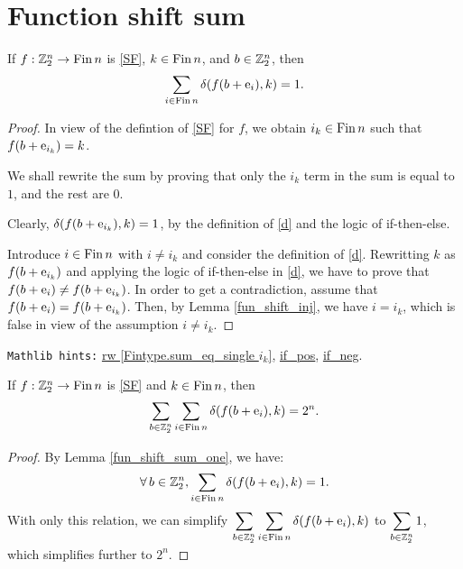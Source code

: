 
\section{Function shift sum}

\bigskip

\begin{lemma}
\label{fun_shift_sum_one}
\leanok
If $f:\mathbb{Z}_2^n \to \mathrm{Fin}\, n$ is \eqref{SF}, $k\in\mathrm{Fin}\, n$, and $b\in\mathbb{Z}_2^n$, then
$$\sum_{i\in\mathrm{Fin}\, n} \delta(f(b+{\rm e}_i),k) = 1.$$
\end{lemma}

\begin{proof}
\leanok
In view of the defintion of \eqref{SF} for $f$, we {\B obtain} $i_k\in\mathrm{Fin}\, n$ such that $f(b+{\rm e}_{i_k}) = k$.

We shall {\B rewrite} the sum by proving that {\B only the $i_k$ term in the sum is equal to $1$, and the rest are $0$}.

Clearly, $\delta(f(b+{\rm e}_{i_k}),k) = 1$, by the definition of \eqref{d} and the logic of {\B if-then-else}.

{\B Introduce} $i\in\mathrm{Fin}\, n$ with $i\neq i_k$ and consider the definition of \eqref{d}. {\B Rewritting} $k$ as  $f(b+{\rm e}_{i_k})$ and {\B applying} the logic of {\B if-then-else} in \eqref{d}, we have to prove that $f(b+{\rm e}_i) \neq f(b+{\rm e}_{i_k})$. In order to get a {\B contradiction}, assume that $f(b+{\rm e}_i) = f(b+{\rm e}_{i_k})$. Then, by {\B Lemma} \ref{fun_shift_inj}, we {\B have} $i=i_k$, which is {\B false} in view of the assumption $i\neq i_k$.
\end{proof}

\verb|Mathlib hints:| \href{https://leanprover-community.github.io/mathlib4_docs/Mathlib/Data/Fintype/BigOperators.html#Fintype.sum_eq_single}{rw [Fintype.sum\_eq\_single $i_k$]}, \href{https://leanprover-community.github.io/mathlib4_docs/Init/Core.html#if_pos}{if\_pos}, \href{https://leanprover-community.github.io/mathlib4_docs/Init/Core.html#if_neg}{if\_neg}.

\bigskip

\begin{lemma}
\label{fun_shift_sum_pow2}
\leanok
 If $f:\mathbb{Z}_2^n \to \mathrm{Fin}\, n$ is \eqref{SF} and $k\in\mathrm{Fin}\, n$, then
$$\sum_{b\in\mathbb{Z}_2^n} \sum_{i\in\mathrm{Fin}\, n} \delta(f(b+{\rm e}_i),k) = 2^n.$$
\end{lemma}

\begin{proof}
\leanok
By  {\B Lemma \ref{fun_shift_sum_one}}, we {\B have}:
$$\forall\, b\in\mathbb{Z}_2^n, \sum_{i\in\mathrm{Fin}\, n} \delta(f(b+{\rm e}_i),k) = 1.$$ With {\B only} this relation, we can {\B simplify}
$\displaystyle\sum_{b\in\mathbb{Z}_2^n} \sum_{i\in\mathrm{Fin}\, n} \delta(f(b+{\rm e}_i),k)$ to  $\displaystyle\sum_{b\in\mathbb{Z}_2^n} 1$,
which {\B simplifies} further to $2^n$.
\end{proof}

